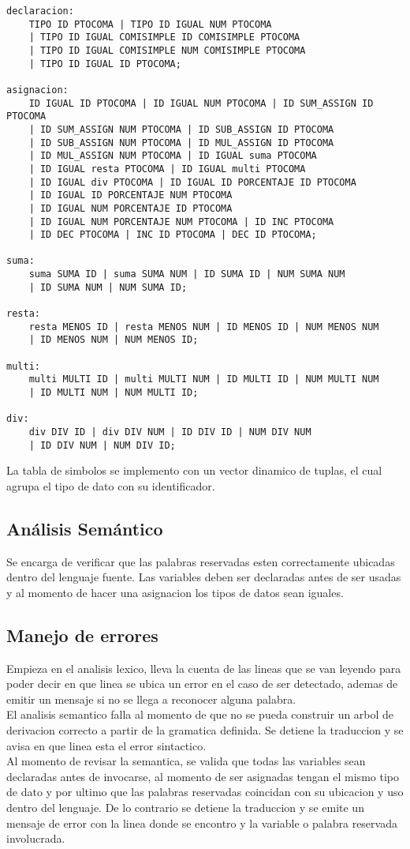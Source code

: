 \documentclass[aspectratio=169]{article}
\begin{document}
\begin{lstlisting}
declaracion:
	TIPO ID PTOCOMA | TIPO ID IGUAL NUM PTOCOMA
	| TIPO ID IGUAL COMISIMPLE ID COMISIMPLE PTOCOMA
	| TIPO ID IGUAL COMISIMPLE NUM COMISIMPLE PTOCOMA
	| TIPO ID IGUAL ID PTOCOMA;

asignacion:
	ID IGUAL ID PTOCOMA | ID IGUAL NUM PTOCOMA | ID SUM_ASSIGN ID PTOCOMA
	| ID SUM_ASSIGN NUM PTOCOMA | ID SUB_ASSIGN ID PTOCOMA
	| ID SUB_ASSIGN NUM PTOCOMA | ID MUL_ASSIGN ID PTOCOMA
	| ID MUL_ASSIGN NUM PTOCOMA | ID IGUAL suma PTOCOMA
	| ID IGUAL resta PTOCOMA | ID IGUAL multi PTOCOMA
	| ID IGUAL div PTOCOMA | ID IGUAL ID PORCENTAJE ID PTOCOMA
	| ID IGUAL ID PORCENTAJE NUM PTOCOMA
	| ID IGUAL NUM PORCENTAJE ID PTOCOMA
	| ID IGUAL NUM PORCENTAJE NUM PTOCOMA | ID INC PTOCOMA
	| ID DEC PTOCOMA | INC ID PTOCOMA | DEC ID PTOCOMA;

suma:
	suma SUMA ID | suma SUMA NUM | ID SUMA ID | NUM SUMA NUM
	| ID SUMA NUM | NUM SUMA ID;

resta:
	resta MENOS ID | resta MENOS NUM | ID MENOS ID | NUM MENOS NUM
	| ID MENOS NUM | NUM MENOS ID;

multi:
	multi MULTI ID | multi MULTI NUM | ID MULTI ID | NUM MULTI NUM
	| ID MULTI NUM | NUM MULTI ID;

div:
	div DIV ID | div DIV NUM | ID DIV ID | NUM DIV NUM
	| ID DIV NUM | NUM DIV ID;

\end{lstlisting}

La tabla de simbolos se implemento con un vector dinamico de tuplas, el cual agrupa el tipo de dato
con su identificador.


\subsection{An\'alisis Sem\'antico}

Se encarga de verificar que las palabras reservadas esten correctamente ubicadas dentro del lenguaje fuente.
Las variables deben ser declaradas antes de ser usadas y al momento de hacer una asignacion los
tipos de datos sean iguales.

\subsection{Manejo de errores}

Empieza en el analisis lexico, lleva la cuenta de las lineas que se van leyendo para poder decir
en que linea se ubica un error en el caso de ser detectado, ademas de emitir un mensaje si no se llega
a reconocer alguna palabra.\\

El analisis semantico falla al momento de que no se pueda construir un arbol de derivacion correcto
a partir de la gramatica definida. Se detiene la traduccion y se avisa en que linea esta el error sintactico.\\

Al momento de revisar la semantica, se valida que todas las variables sean declaradas antes de invocarse,
al momento de ser asignadas tengan el mismo tipo de dato y por ultimo que las palabras reservadas coincidan
con su ubicacion y uso dentro del lenguaje. De lo contrario se detiene la traduccion y se emite un mensaje
de error con la linea donde se encontro y la variable o palabra reservada involucrada.
\end{document}
